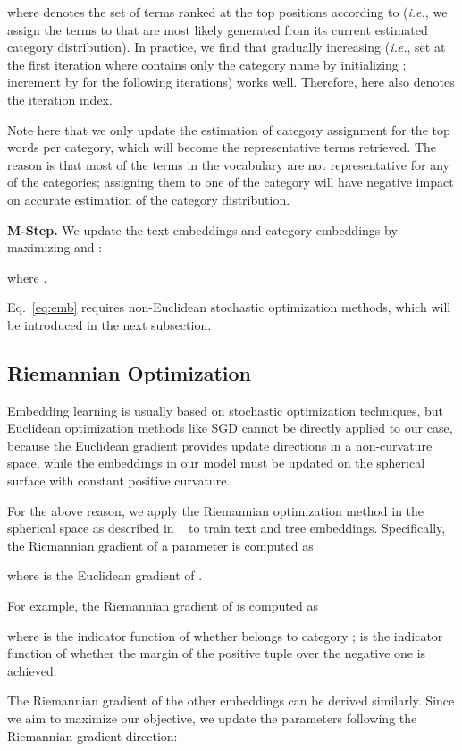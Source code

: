 \documentclass[sigconf]{acmart}
\newcommand{\ie}{\emph{i.e.}}
\theoremstyle{definition}
\begin{document}
where  denotes the set of terms ranked at the top  positions according to  (\ie, we assign the  terms to  that are most likely generated from its current estimated category distribution). In practice, we find that gradually increasing  (\ie, set  at the first iteration where  contains only the category name  by initializing ; increment  by  for the following iterations) works well. Therefore, here  also denotes the iteration index.

Note here that we only update the estimation of category assignment for the top  words per category, which will become the representative terms retrieved. The reason is that most of the terms in the vocabulary are not representative for any of the categories; assigning them to one of the category will have negative impact on accurate estimation of the category distribution. 

\noindent
\textbf{M-Step.}
We update the text embeddings and category embeddings by maximizing  and :






where .


Eq.~\eqref{eq:emb} requires non-Euclidean stochastic optimization methods, which will be introduced in the next subsection.

\subsection{Riemannian Optimization}
Embedding learning is usually based on stochastic optimization techniques, but Euclidean optimization methods like SGD cannot be directly applied to our case, because the Euclidean gradient provides update directions in a non-curvature space, while the embeddings in our model must be updated on the spherical surface  with constant positive curvature. 

For the above reason, we apply the Riemannian optimization method in the spherical space as described in ~\cite{meng2019spherical} to train text and tree embeddings. Specifically, the Riemannian gradient of a parameter  is computed as

where  is the Euclidean gradient of .

For example, the Riemannian gradient of  is computed as 

where  is the indicator function of whether  belongs to category ;  is the indicator function of whether the margin of the positive tuple over the negative one is achieved.

The Riemannian gradient of the other embeddings can be derived similarly. Since we aim to maximize our objective, we update the parameters following the Riemannian gradient direction:
\end{document}
